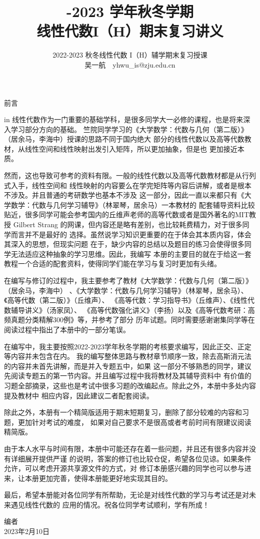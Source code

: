 \documentclass{ctexbook}
\title{\heiti 2022-2023 学年秋冬学期 \\ 线性代数I（H）期末复习讲义}
\author{2022-2023 秋冬线性代数 I（H）辅学期末复习授课 \\ 吴一航\ \ yhwu\_is@zju.edu.cn}
\begin{document}
\maketitle
\centerline{\huge \heiti 前言}
 in
\kaishu
线性代数作为一门重要的基础学科，是很多同学大一必修的课程，也是将来深入学习部分方向的基础。
竺院同学学习的《大学数学：代数与几何（第二版）》（居余马，李海中）授课的思路不同于国内绝大
部分的线性代数以及高等代数教材，从线性空间和线性映射出发引入矩阵，所以更加抽象，但是也
更加接近本质。

然而，这也导致可参考的资料有限。一般的线性代数以及高等代数教材都是从行列式入手，线性空间和
线性映射的内容要么在学完矩阵等内容后讲解，或者是根本不涉及。并且普通的考研数学也基本不涉及
这一部分，因此一直以来都只有《大学数学：代数与几何学习辅导》（林翠琴，居余马）一本教材的
配套辅导资料比较贴近，很多同学可能会参考国内的丘维声老师的高等代数或者是国外著名的MIT教授
Gilbert Strang 的网课，但内容还是略有差别，也比较耗费精力，对于很多同学而言并不是最好的
选择。虽然说学习知识更重要的在于体会其本质内容，体会其深入的思想，但现实问题
在于，缺少内容的总结以及题目的练习会使得很多同学无法适应这种抽象的学习思维。因此，我编写
本册的主要目的就在于给这一套教程一个合适的配套资料，使得同学们能在学习与复习时更加有头绪。

在编写与修订的过程中，我主要参考了教材《大学数学：代数与几何（第二版）》（居余马，李海中）
、《大学数学：代数与几何学习辅导》（林翠琴，居余马）、《高等代数（第二版）》（丘维声）、
《高等代数：学习指导书》（丘维声）、《线性代数辅导讲义》（汤家凤）、
《高等代数强化讲义》（李扬）以及《高等代数考研：高频真题分类精解300例》等，并参考了部分
历年试题。同时需要感谢谢集同学等在阅读过程中指出了本册中的一部分笔误。

在编写中，我主要按照2022-2023学年秋冬学期的考核要求编写，因此正交、正定等内容并未包含在内。
我的编写整体思路与教材章节顺序一致，除去高斯消元法的内容并未首先讲解，而是并入专题五中，如果
这一部分不够熟悉的同学，建议先阅读专题五的第一节内容。并且编写过程中我将教材及其辅导资料中
有价值的习题全部摘录，这些也是考试中很多习题的改编起点。除此之外，本册中多处内容提及教材中
相应内容，因此建议二者配套阅读。

除此之外，本册有一个精简版适用于期末短期复习，删除了部分较难的内容和习题，更加针对考试的难度，
如果对自己要求不是很高或者考前时间有限建议阅读精简版。

由于本人水平与时间有限，本册中可能还存在着一些问题，并且还有很多内容并没有详细展开提供严谨
的说明，答案的修订也比较仓促，希望各位见谅。如果条件允许，可以考虑开源共享源文件的方式，对
修订本册感兴趣的同学也可以参与进来，让本册更加完善，使得本册能更好地实现其目的。

最后，希望本册能对各位同学有所帮助，无论是对线性代数的学习与考试还是对未来遇见线性代数的
应用的情况。祝各位同学考试顺利，学有所成！

\begin{flushright}
    \songti 编者 \\
    2023年2月10日
\end{flushright}
\songti
\tableofcontents
\newpage
\setcounter{page}{1} %






\end{document}
